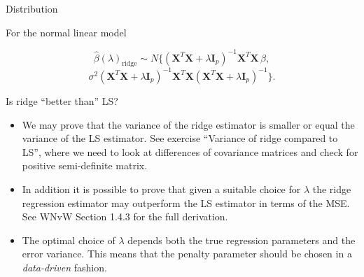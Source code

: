 \documentclass[
  ignorenonframetext,
]{beamer}
\begin{document}
\begin{frame}

\begin{block}{Distribution}

For the normal linear model

\[\hat{\beta}(\lambda)_{\text{ridge}} \sim N \{ (\mathbf{X}^T \mathbf{X} + \lambda \mathbf{I}_{p})^{-1} \mathbf{X}^T \mathbf{X} \, \beta,\]
\[\sigma^2 ( \mathbf{X}^T \mathbf{X} + \lambda \mathbf{I}_{p} )^{-1}  \mathbf{X}^T \mathbf{X} ( \mathbf{X}^T \mathbf{X} + \lambda \mathbf{I}_{p} )^{-1}  \}.
\]

\end{block}

\end{frame}

\begin{frame}

\begin{block}{Is ridge ``better than'' LS?}

\begin{itemize}
\item
  We may prove that the variance of the ridge estimator is smaller or
  equal the variance of the LS estimator. See exercise ``Variance of
  ridge compared to LS'', where we need to look at differences of
  covariance matrices and check for positive semi-definite matrix.
\item
  In addition it is possible to prove that given a suitable choice for
  \(\lambda\) the ridge regression estimator may outperform the LS
  estimator in terms of the MSE. See WNvW Section 1.4.3 for the full
  derivation.
\item
  The optimal choice of \(\lambda\) depends both the true regression
  parameters and the error variance. This means that the penalty
  parameter should be chosen in a \emph{data-driven} fashion.
\end{itemize}

\end{block}

\end{frame}
\end{document}
